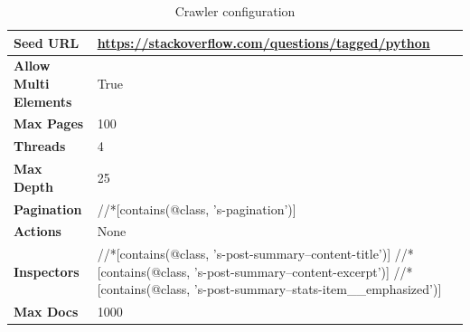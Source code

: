 {\begin{table}[ht] 
{\footnotesize
\begin{tabular}{ P{3cm} ||P{10.1cm}  }      %
 \hline \hline
\textbf{Seed URL} & \href{https://stackoverflow.com/questions/tagged/python}{https://stackoverflow.com/questions/tagged/python}\T\B 
\\ 
\hline
\textbf{Allow Multi Elements} & True \T\B 
\\ 
\hline
\textbf{Max Pages} & 100\T\B 
\\ 
\hline
\textbf{Threads} & 4\T\B 
\\ 
\hline
\textbf{Max Depth} & 25\T\B 
\\ 
\hline
\textbf{Pagination} & //*[contains(@class, 's-pagination')]\T\B 
\\ 
\hline
\textbf{Actions} & None\T\B 
\\ 
\hline
\textbf{Inspectors} & //*[contains(@class, 's-post-summary--content-title')]\T\B  \newline
//*[contains(@class, 's-post-summary--content-excerpt')]	
 \newline
//*[contains(@class, 's-post-summary--stats-item\_\_emphasized')]	
\\ 
\hline
\textbf{Max Docs} & 1000\T\B 
\\ 
\hline \hline
    \end{tabular}
}
  \captionsetup{justification=centering,margin=2cm}
  \caption{Crawler configuration}
\end{table}



}
